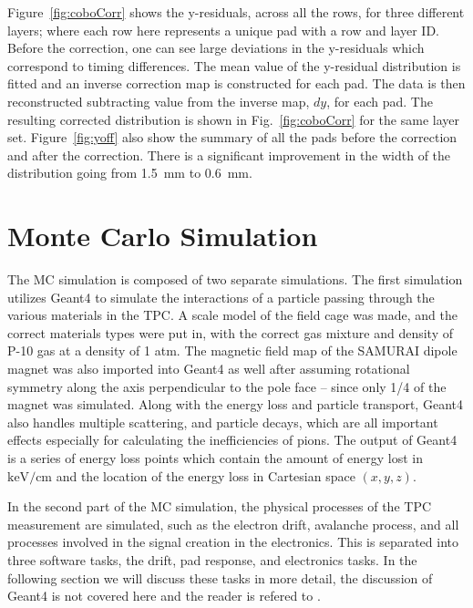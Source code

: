  Figure~\ref{fig:coboCorr} shows the y-residuals, across all the rows, for three different layers; where each row here represents a unique pad with a row and layer ID. Before the correction, one can see large deviations in the y-residuals which correspond to timing differences. The mean value of the y-residual distribution is fitted and an inverse correction map is constructed for each pad. The data is then reconstructed subtracting value from the inverse map, $dy$, for each pad. The resulting corrected distribution is shown in Fig.~\ref{fig:coboCorr} for the same layer set. Figure~\ref{fig:yoff} also show the summary of all the pads before the correction and after the correction. There is a significant improvement in the width of the distribution going from \SI{1.5}{\milli\metre} to \SI{0.6}{\milli\metre}. 






\section{Monte Carlo Simulation}
\label{sec:monteCarlo}

The MC simulation is composed of two separate simulations. The first simulation utilizes Geant4 to simulate the interactions of a particle passing through the various materials in the TPC. A scale model of the field cage was made, and the correct materials types were put in, with the correct gas mixture and density of P-10 gas at a density of 1 atm. The magnetic field map of the SAMURAI dipole magnet was also imported into Geant4 as well after assuming rotational symmetry along the axis perpendicular to the pole face -- since only 1/4 of the magnet was simulated. Along with the energy loss and particle transport, Geant4 also handles multiple scattering, and particle decays, which are all important effects especially for calculating the inefficiencies of pions. The output of Geant4 is a series of energy loss points which contain the amount of energy lost in $\si{\kilo\electronvolt\per\centi\metre}$ and the location of the energy loss in Cartesian space $(x,y,z)$. 

In the second part of the MC simulation, the physical processes of the TPC measurement are simulated, such as the electron drift, avalanche process, and all processes involved in the signal creation in the electronics. This is separated into three software tasks, the drift, pad response, and electronics tasks. In the following section we will discuss these tasks in more detail, the discussion of Geant4 is not covered here and the reader is refered to \cite{geant4}.  

